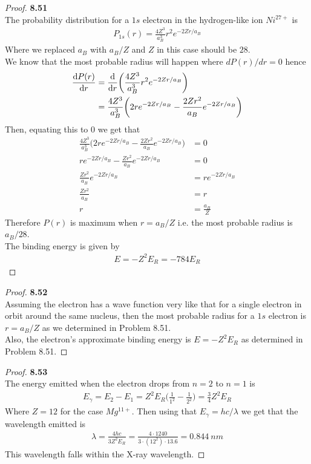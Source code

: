 \documentclass[11pt]{article}
\theoremstyle{definition}
\begin{document}
\cleardoublepage
\begin{proof}{\textbf{8.51}}\\
The probability distribution for a $1s$ electron in the hydrogen-like ion
$Ni^{27+}$ is 
\begin{align*}
    P_{1s}(r) = \frac{4Z^3}{a_B^3}r^2 e^{-2Zr/a_B}
\end{align*}
Where we replaced $a_B$ with $a_B/Z$ and $Z$ in this case should be $28$.  
\\
We know that the most probable radius will happen where $dP(r)/dr = 0$ hence
\begin{align*}
    \dv{P(r)}{r} &= \dv{r}(\frac{4Z^3}{a_B^3}r^2 e^{-2Zr/a_B})\\
    &= \frac{4Z^3}{a_B^3}\bigg(2r e^{-2Zr/a_B} - \frac{2Zr^2}{a_B} e^{-2Zr/a_B}\bigg)
\end{align*}
Then, equating this to 0 we get that
\begin{align*}
    \frac{4Z^3}{a_B^3}\bigg(2r e^{-2Zr/a_B} - \frac{2Zr^2}{a_B} e^{-2Zr/a_B}\bigg)
    &= 0\\
    r e^{-2Zr/a_B} - \frac{Zr^2}{a_B} e^{-2Zr/a_B} &= 0\\
    \frac{Zr^2}{a_B} e^{-2Zr/a_B} &= r e^{-2Zr/a_B}\\
    \frac{Zr^2}{a_B} &= r\\
    r &= \frac{a_B}{Z}
\end{align*}
Therefore $P(r)$ is maximum when $r = a_B/Z$ i.e. the most probable radius is
$a_B/28$.
\\
The binding energy is given by
\begin{align*}
    E = -Z^2E_R = -784E_R
\end{align*}
\end{proof}

\cleardoublepage
\begin{proof}{\textbf{8.52}}\\
Assuming the electron has a wave function very like that for a single electron
in orbit around the same nucleus, then the most probable radius for a $1s$
electron is $r = a_B/Z$ as we determined in Problem 8.51.
\\
Also, the electron's approximate binding energy is $E = -Z^2E_R$ as
determined in Problem 8.51.
\end{proof}

\cleardoublepage
\begin{proof}{\textbf{8.53}}\\
The energy emitted when the electron drops from $n= 2$ to $n = 1$ is
\begin{align*}
    E_\gamma = E_2 - E_1 = Z^2E_R\bigg(\frac{1}{1^2}-\frac{1}{2^2}\bigg)
    = \frac{3}{4}Z^2E_R
\end{align*}
Where $Z = 12$ for the case $Mg^{11+}$.
Then using that $E_\gamma = hc/\lambda$ we get that the wavelength emitted is
\begin{align*}
    \lambda = \frac{4hc}{3Z^2E_R} = \frac{4\cdot 1240}{3\cdot (12^2) \cdot 13.6}
    = 0.844~nm
\end{align*}
This wavelength falls within the X-ray wavelength.
\end{proof}
\end{document}
